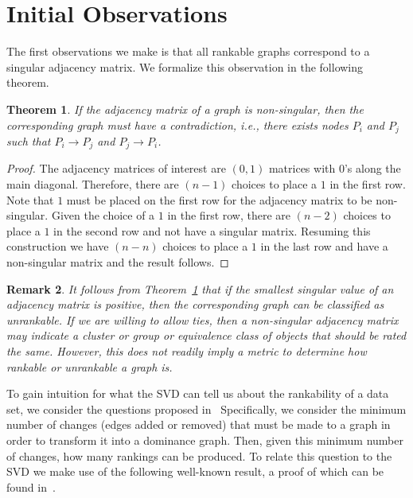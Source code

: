 \documentclass{article}
\newtheorem{theorem}{Theorem}[section]
\newtheorem{remark}[theorem]{Remark}
\begin{document}
\section{Initial Observations}\label{sec: observations}
The first observations we make is that all rankable graphs correspond to a singular adjacency matrix. We formalize this observation in the following theorem.

\begin{theorem}\label{thm: basic_obs}
If the adjacency matrix of a graph is non-singular, then the corresponding graph must have a contradiction, i.e., there exists nodes $P_{i}$ and $P_{j}$ such that $P_{i}\rightarrow P_{j}$ and $P_{j}\rightarrow P_{i}$. 
\end{theorem}
\begin{proof}
The adjacency matrices of interest are $(0,1)$ matrices with $0$'s along the main diagonal. Therefore, there are $(n-1)$ choices to place a $1$ in the first row.
Note that $1$ must be placed on the first row for the adjacency matrix to be non-singular. 
Given the choice of a $1$ in the first row, there are $(n-2)$ choices to place a $1$ in the second row and not have a singular matrix. 
Resuming this construction we have $(n-n)$ choices to place a $1$ in the last row and have a non-singular matrix and the result follows.
\end{proof}

\begin{remark}
It follows from Theorem~\ref{thm: basic_obs} that if the smallest singular value of an adjacency matrix is positive, then the corresponding graph can be classified as unrankable. 
If we are willing to allow ties, then a non-singular adjacency matrix may indicate a cluster or group or equivalence class of objects that should be rated the same. 
However, this does not readily imply a metric to determine how rankable or unrankable a graph is. 
\end{remark}

To gain intuition for what the SVD can tell us about the rankability of a data set, we consider the questions proposed in~\cite[Section 5.1]{Anderson}
Specifically, we consider the minimum number of changes (edges added or removed) that must be made to a graph in order to transform it into a dominance graph.
Then, given this minimum number of changes, how many rankings can be produced.
To relate this question to the SVD we make use of the following well-known result, a proof of which can be found in~\cite[Theorem 4.2.15]{Watkins}.
\end{document}
